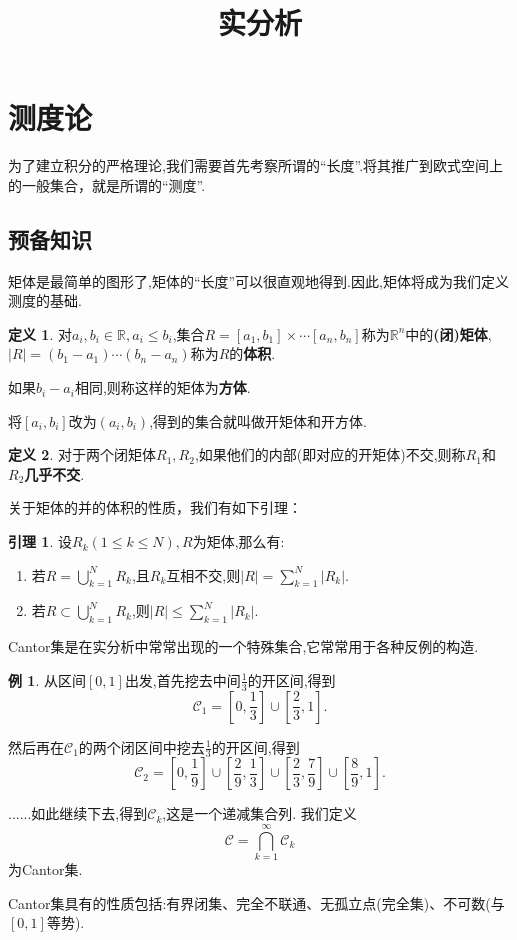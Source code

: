 \documentclass{ctexart}
\title{实分析}
\author{}
\date{}
\theoremstyle{definition}
\newtheorem{definition}{定义}
\newtheorem{lemma}{引理}
\newtheorem{example}{例}
\theoremstyle{remark}
\begin{document}
	\maketitle
	
	\section{测度论}
	为了建立积分的严格理论,我们需要首先考察所谓的``长度''.将其推广到欧式空间上的一般集合，就是所谓的``测度''.
	
	\subsection{预备知识}
	
	矩体是最简单的图形了,矩体的``长度''可以很直观地得到.因此,矩体将成为我们定义测度的基础.
	\begin{definition}
		对$a_i,b_i\in\mathbb{R},a_i\le b_i$,集合$R=[a_1,b_1]\times\cdots[a_n,b_n]$称为$\mathbb{R}^n$中的\textbf{(闭)矩体},$|R|=(b_1-a_1)\cdots(b_n-a_n)$称为$R$的\textbf{体积}.
		
		如果$b_i-a_i$相同,则称这样的矩体为\textbf{方体}.
		
		将$[a_i,b_i]$改为$(a_i,b_i)$,得到的集合就叫做开矩体和开方体.
	\end{definition}
	\begin{definition}
		对于两个闭矩体$R_1,R_2$,如果他们的内部(即对应的开矩体)不交,则称$R_1$和$R_2$\textbf{几乎不交}.
	\end{definition}
	
	关于矩体的并的体积的性质，我们有如下引理：
	\begin{lemma}
		设$R_k(1\le k\le N),R$为矩体,那么有:
		\begin{enumerate}
			\item 若$R=\bigcup_{k=1}^N R_k$,且$R_k$互相不交,则$|R|=\sum_{k=1}^N{|R_k|}$.
			\item 若$R\subset\bigcup_{k=1}^N R_k$,则$|R|\le\sum_{k=1}^N{|R_k|}$.
		\end{enumerate}
	\end{lemma}
	
	\hspace*{\fill}
	
	Cantor集是在实分析中常常出现的一个特殊集合,它常常用于各种反例的构造.
	\begin{example}
		从区间$[0,1]$出发,首先挖去中间$\frac{1}{3}$的开区间,得到
		$$\mathcal{C}_1=[0,\frac{1}{3}]\cup[\frac{2}{3},1].$$
		
		然后再在$\mathcal{C}_1$的两个闭区间中挖去$\frac{1}{3}$的开区间,得到
		$$\mathcal{C}_2=[0,\frac{1}{9}]\cup[\frac{2}{9},\frac{1}{3}]\cup[\frac{2}{3},\frac{7}{9}]\cup[\frac{8}{9},1].$$
		
		......如此继续下去,得到$\mathcal{C}_k$,这是一个递减集合列.
		我们定义
		$$\mathcal{C}=\bigcap_{k=1}^\infty{\mathcal{C}_k}$$
		为Cantor集.
		
		Cantor集具有的性质包括:有界闭集、完全不联通、无孤立点(完全集)、不可数(与$[0,1]$等势).
	\end{example}
	
\end{document}
